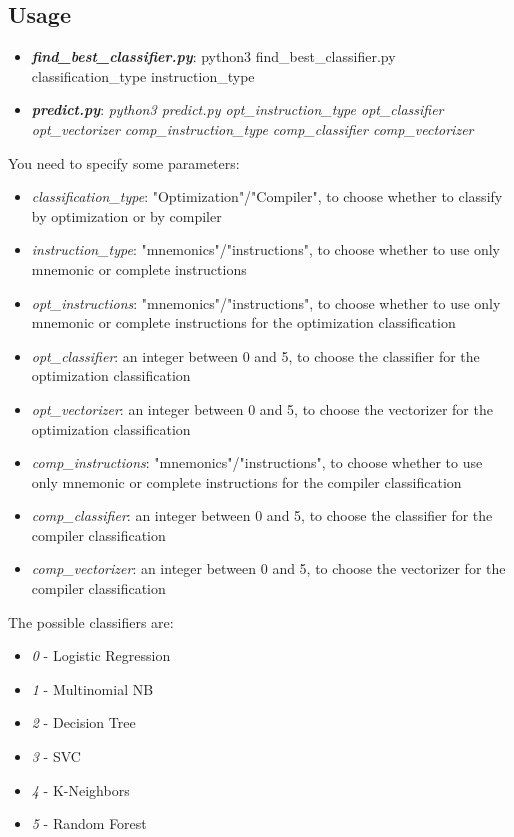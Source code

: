 \documentclass[11pt]{article}
\begin{document}
\subsection{Usage}
\begin{itemize}
	\item \textbf{\textit{find\_best\_classifier.py}}: python3 find\_best\_classifier.py classification\_type instruction\_type
	\item \textbf{\textit{predict.py}}: \textit{python3 predict.py opt\_instruction\_type opt\_classifier opt\_vectorizer comp\_instruction\_type comp\_classifier comp\_vectorizer}
\end{itemize}
You need to specify some parameters:
\begin{itemize}
	\item \textit{classification\_type}: "Optimization"/"Compiler", to choose whether to classify by optimization or by compiler 
	\item \textit{instruction\_type}: "mnemonics"/"instructions", to choose whether to use only mnemonic or complete instructions
	\item \textit{opt\_instructions}: "mnemonics"/"instructions", to choose whether to use only mnemonic or complete instructions for the optimization classification
	\item \textit{opt\_classifier}: an integer between 0 and 5, to choose the classifier for the optimization classification
	\item \textit{opt\_vectorizer}: an integer between 0 and 5, to choose the vectorizer for the optimization classification
	\item \textit{comp\_instructions}: "mnemonics"/"instructions", to choose whether to use only mnemonic or complete instructions for the compiler classification
	\item \textit{comp\_classifier}: an integer between 0 and 5, to choose the classifier for the compiler classification
	\item \textit{comp\_vectorizer}: an integer between 0 and 5, to choose the vectorizer for the compiler classification
\end{itemize}

The possible classifiers are:
\begin{itemize}
	\item \textit{0} - Logistic Regression
	\item \textit{1} - Multinomial NB
	\item \textit{2} - Decision Tree
	\item \textit{3} - SVC
	\item \textit{4} - K-Neighbors
	\item \textit{5} - Random Forest
\end{itemize}
\end{document}

